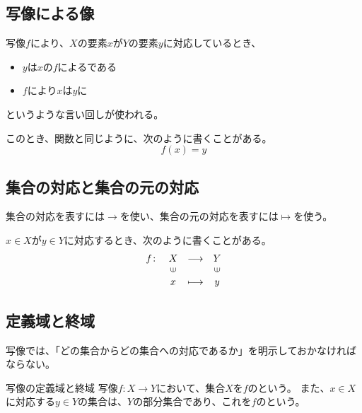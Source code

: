 \documentclass[../../../topic_linear-algebra]{subfiles}
\begin{document}
\subsection{写像による像}

写像$f$により、$X$の要素$x$が$Y$の要素$y$に対応しているとき、
\begin{itemize}
  \item $y$は$x$の$f$によるである
  \item $f$により$x$は$y$に
\end{itemize}
というような言い回しが使われる。

\br

このとき、関数と同じように、次のように書くことがある。
\begin{equation*}
  f(x) = y
\end{equation*}

\subsection{集合の対応と集合の元の対応}

集合の対応を表すには$\to$を使い、集合の元の対応を表すには$\mapsto$を使う。

\br

$x \in X$が$y \in Y$に対応するとき、次のように書くことがある。
\begin{equation*}
  \begin{array}{lclc}
    f \colon & X         & \longrightarrow & Y          \\
            & \rotatebox{90}{$\in$} &                 & \rotatebox{90}{$\in$} \\
            & x              & \longmapsto     & y
  \end{array}
\end{equation*}

\subsection{定義域と終域}

写像では、「どの集合からどの集合への対応であるか」を明示しておかなければならない。

\begin{definition*}{写像の定義域と終域}
  写像$f\colon X \to Y$において、集合$X$を$f$のという。
  また、$x \in X$に対応する$y \in Y$の集合は、$Y$の部分集合であり、これを$f$のという。
\end{definition*}
\end{document}
